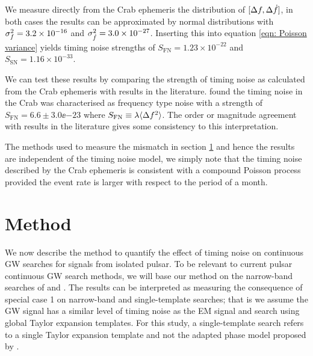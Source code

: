\documentclass[../full_thesis/full_thesis.tex]{subfiles}
\begin{document}
{%

We measure directly from the Crab ephemeris the distribution of
$[\Delta f,\Delta\dot{f}]$, in both  cases the results can be approximated by
normal distributions with $\sigma_{f}^{2}=3.2\times10^{-16}$ and
$\sigma_{\dot{f}}^{2}=3.0\times10^{-27}$. Inserting this into equation
\eqref{eqn: Poisson variance} yields timing noise strengths of
$S_{\textrm{FN}}=1.23\times10^{-22}$ and $S_{\textrm{SN}}=1.16\times10^{-33}$.

We can test these results by comparing the strength of timing noise as
calculated from the Crab ephemeris with results in the literature.
\citet{Cordes1981} found the timing noise in the Crab was characterised  as
frequency type noise with a strength of $S_{\textrm{FN}}=6.6 \pm 3.0 \ee{-23}$
where $S_{\textrm{FN}} \equiv \lambda \langle\Delta f^{2}\rangle$.  The order
or magnitude agreement with results in the literature gives some consistency to
this interpretation.

The methods used to measure the mismatch in section \ref{sec: narrow-band method} and hence
the results are independent of the timing noise model, we simply note that the
timing noise described by the Crab ephemeris is consistent with a compound
Poisson process provided the event rate is larger with respect to the period of
a month.
}


\section{Method}
\label{sec: narrow-band method}
We now describe the method to quantify the effect of timing noise on continuous GW
searches for signals from isolated pulsar.
To be relevant to current pulsar continuous GW search methods, we will base our
method on the narrow-band searches of \citet{ligo2008} and \citet{ligo2015}. The results can be interpreted as measuring the consequence of
special case 1 on narrow-band and single-template searches; that is we assume
the GW signal has a similar level of timing noise as the EM signal and search
using global Taylor expansion templates. For this study, a single-template
search refers to a single Taylor expansion template and not the adapted phase
model proposed by \citet{Pitkin2004}.
\end{document}
